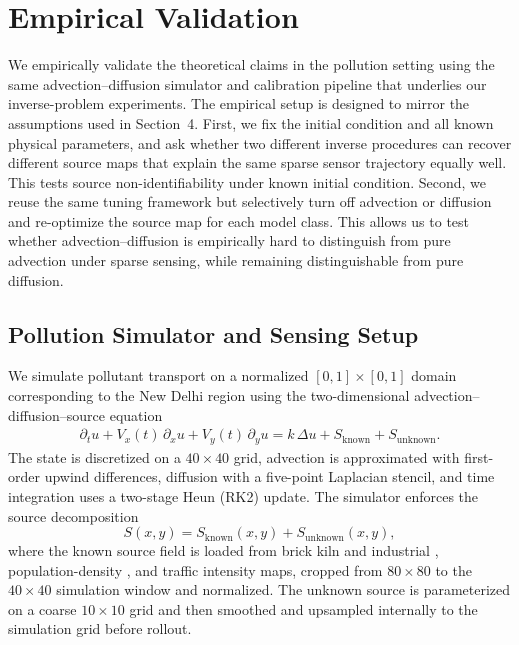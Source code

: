 \section{Empirical Validation}
\label{sec:empirical_validation}

We empirically validate the theoretical claims in the pollution setting using the same advection--diffusion simulator and calibration pipeline that underlies our inverse-problem experiments. The empirical setup is designed to mirror the assumptions used in Section~4. First, we fix the initial condition and all known physical parameters, and ask whether two different inverse procedures can recover different source maps that explain the same sparse sensor trajectory equally well. This tests source non-identifiability under known initial condition. Second, we reuse the same tuning framework but selectively turn off advection or diffusion and re-optimize the source map for each model class. This allows us to test whether advection--diffusion is empirically hard to distinguish from pure advection under sparse sensing, while remaining distinguishable from pure diffusion.

\subsection{Pollution Simulator and Sensing Setup}
\label{subsec:pollution_setup}

We simulate pollutant transport on a normalized $[0,1]\times[0,1]$ domain corresponding to the New Delhi region using the two-dimensional advection--diffusion--source equation
\begin{align}
\partial_t u + V_x(t)\,\partial_x u + V_y(t)\,\partial_y u
= k\,\Delta u + S_{\mathrm{known}} + S_{\mathrm{unknown}}. \nonumber
\end{align}
The state is discretized on a $40\times 40$ grid, advection is approximated with first-order upwind differences, diffusion with a five-point Laplacian stencil, and time integration uses a two-stage Heun (RK2) update. The simulator enforces the source decomposition
\begin{equation}
S(x,y) = S_{\mathrm{known}}(x,y) + S_{\mathrm{unknown}}(x,y), \nonumber
\end{equation}
where the known source field is loaded from brick kiln and industrial \citep{GUTTIKUNDA2013101}, population-density \citep{ColumbiaUniversity2018}, and traffic intensity \citep{google_maps} maps, cropped from $80\times 80$ to the $40\times 40$ simulation window and normalized. The unknown source is parameterized on a coarse $10\times 10$ grid and then smoothed and upsampled internally to the simulation grid before rollout.

